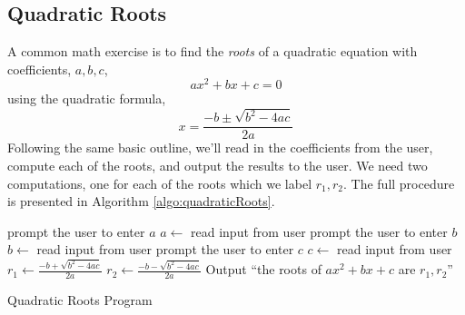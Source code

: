 \subsection{Quadratic Roots}

A common math exercise is to find the \emph{roots} of a quadratic equation
with coefficients, $a, b, c$,   
  $$ax^2 + bx + c = 0$$
using the quadratic formula, 
  $$x = \frac{-b \pm \sqrt{b^2 - 4ac}}{2a}$$
Following the same basic outline, we'll read in the coefficients from the user, 
compute each of the roots, and output the results to the user.  We
need two computations, one for each of the roots which we label $r_1, r_2$.
The full procedure is presented in Algorithm \ref{algo:quadraticRoots}.

\begin{algorithm}
prompt the user to enter $a$ \;
$a \leftarrow$ read input from user \; 
prompt the user to enter $b$ \;
$b \leftarrow$ read input from user \; 
prompt the user to enter $c$ \;
$c \leftarrow$ read input from user \; 
$r_1 \leftarrow \frac{-b + \sqrt{b^2 - 4ac}}{2a}$ \;
$r_2 \leftarrow \frac{-b - \sqrt{b^2 - 4ac}}{2a}$ \;
Output ``the roots of $ax^2 + bx + c$ are $r_1, r_2$'' \;
\caption{Quadratic Roots Program}
\label{algo:quadraticRoots}
\end{algorithm}


